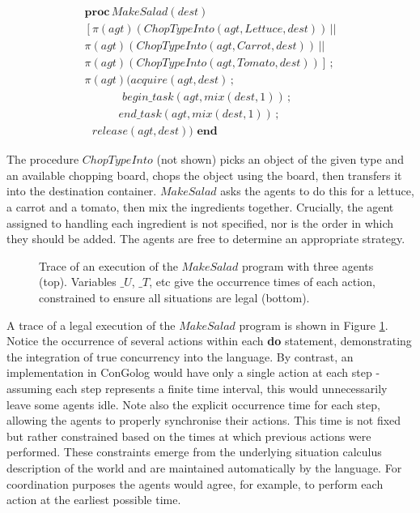 \documentclass[letterpaper]{article}
\begin{document}
\[
\begin{array}{c}
\mathbf{proc}\, MakeSalad(dest)\\
\left[\pi(agt)(ChopTypeInto(agt,Lettuce,dest))\,||\right.\\
\pi(agt)(ChopTypeInto(agt,Carrot,dest))\,||\\
\left.\pi(agt)(ChopTypeInto(agt,Tomato,dest))\right]\,;\\
\pi(agt)(acquire(agt,dest)\,;\\
\,\,\,\,\,\,\,\,\,\,\,\,\,\,\,\,\,\,\,\, begin\_ task(agt,mix(dest,1))\,;\\
\,\,\,\,\,\,\,\,\,\,\,\,\,\,\,\,\,\, end\_ task(agt,mix(dest,1))\,;\\
\,\,\,\, release(agt,dest))\,\,\mathbf{end}\end{array}\]


The procedure $ChopTypeInto$ (not shown) picks an object of the given
type and an available chopping board, chops the object using the board,
then transfers it into the destination container. $MakeSalad$ asks
the agents to do this for a lettuce, a carrot and a tomato, then mix
the ingredients together. Crucially, the agent assigned to handling
each ingredient is not specified, nor is the order in which they should
be added. The agents are free to determine an appropriate strategy.

%
\begin{figure}[hbt]





\caption{\label{cap:example_trace}Trace of an execution of the $MakeSalad$
program with three agents (top). Variables $\_ U$, $\_ T$, etc give
the occurrence times of each action, constrained to ensure all situations
are legal (bottom).}
\end{figure}


A trace of a legal execution of the $MakeSalad$ program is shown
in Figure \ref{cap:example_trace}. Notice the occurrence of several
actions within each \textbf{do} statement, demonstrating the integration
of true concurrency into the language. By contrast, an implementation
in ConGolog would have only a single action at each step - assuming
each step represents a finite time interval, this would unnecessarily
leave some agents idle. Note also the explicit occurrence time for
each step, allowing the agents to properly synchronise their actions.
This time is not fixed but rather constrained based on the times at
which previous actions were performed. These constraints emerge from
the underlying situation calculus description of the world and are
maintained automatically by the language. For coordination purposes
the agents would agree, for example, to perform each action at the
earliest possible time.
\end{document}
